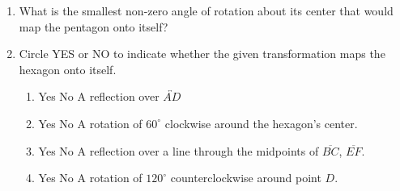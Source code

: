 \documentclass[12pt, oneside]{article}
\begin{document}
\begin{enumerate}[itemsep=0cm]
\item What is the smallest non-zero angle of rotation about its center that would map the pentagon onto itself? \vspace{0.25cm} %
  \begin{center}
    \end{center}

\item Circle YES or NO to indicate whether the given transformation maps the hexagon onto itself.
\vspace{0.5cm}
\begin{multicols}{2}
  \begin{enumerate}
    \item Yes \quad No \quad A reflection over $\overleftrightarrow{AD}$
    \item Yes \quad No \quad A rotation of $60^\circ$ clockwise around the hexagon's center.
    \item Yes \quad No \quad A reflection over a line through the midpoints of  $\overline{BC}$, $\overline{EF}$.
    \item Yes \quad No \quad A rotation of $120^\circ$ counterclockwise around point $D$.
    \end{enumerate}
  \begin{center}
    \end{center}
  \end{multicols}


\end{enumerate}
\end{document}

